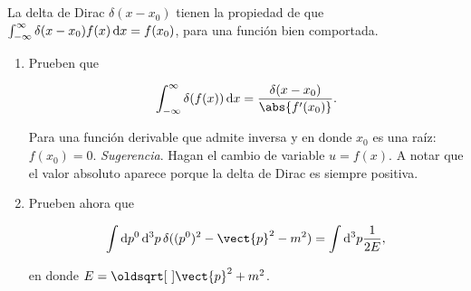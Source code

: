 \documentclass[./../main.tex]{subfiles}
\begin{document}
    \section{}

    La delta de Dirac \(\delta(x - x_{0})\) tienen la propiedad de que \(\int_{-\infty}^{\infty}\delta(x - x_{0})f(x)\odif{x} = f(x_{0})\), para una función bien comportada.

    \begin{enumerate}
        \item Prueben que
        
        \begin{equation*}
            \int_{-\infty}^{\infty}\delta(f(x))\odif{x} = \dfrac{\delta(x - x_{0})}{\abs{f^{\prime}(x_{0})}}.
        \end{equation*}

        Para una función derivable que admite inversa y en donde \(x_{0}\) es una raíz: \(f(x_{0}) = 0\). \emph{Sugerencia}. Hagan el cambio de variable \(u = f(x)\). A notar que el valor absoluto aparece porque la delta de Dirac es siempre positiva.

        \item Prueben ahora que 
        
        \begin{equation*}
            \int\odif{p^{0}}\odif[order=3]{p}\, \delta((p^{0})^{2} - {\vect{p}}^{2} - m^{2}) = \int\odif[order=3]{p}\dfrac{1}{2E},
        \end{equation*}

        en donde \(E = \sqrt{{\vect{p}}^{2} + m^{2}}\).
    \end{enumerate}
\end{document}
